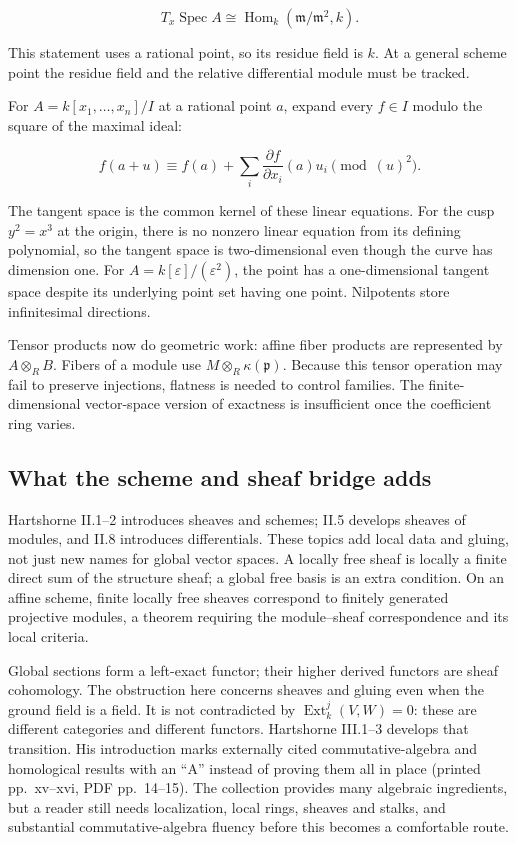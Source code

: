 \documentclass[
  11pt,
]{article}
\begin{document}
\[T_x\operatorname{Spec}A\cong
\operatorname{Hom}_k(\mathfrak m/\mathfrak m^2,k).\]

This statement uses a rational point, so its residue field is \(k\). At
a general scheme point the residue field and the relative differential
module must be tracked.

For \(A=k[x_1,\ldots,x_n]/I\) at a rational point \(a\), expand every
\(f\in I\) modulo the square of the maximal ideal:

\[f(a+u)\equiv f(a)+\sum_i
\frac{\partial f}{\partial x_i}(a)u_i\pmod{(u)^2}.\]

The tangent space is the common kernel of these linear equations. For
the cusp \(y^2=x^3\) at the origin, there is no nonzero linear equation
from its defining polynomial, so the tangent space is two-dimensional
even though the curve has dimension one. For
\(A=k[\varepsilon]/(\varepsilon^2)\), the point has a one-dimensional
tangent space despite its underlying point set having one point.
Nilpotents store infinitesimal directions.

Tensor products now do geometric work: affine fiber products are
represented by \(A\otimes_R B\). Fibers of a module use
\(M\otimes_R\kappa(\mathfrak p)\). Because this tensor operation may
fail to preserve injections, flatness is needed to control families. The
finite-dimensional vector-space version of exactness is insufficient
once the coefficient ring varies.

\subsection{What the scheme and sheaf bridge
adds}\label{what-the-scheme-and-sheaf-bridge-adds}

Hartshorne II.1--2 introduces sheaves and schemes; II.5 develops sheaves
of modules, and II.8 introduces differentials. These topics add local
data and gluing, not just new names for global vector spaces. A locally
free sheaf is locally a finite direct sum of the structure sheaf; a
global free basis is an extra condition. On an affine scheme, finite
locally free sheaves correspond to finitely generated projective
modules, a theorem requiring the module--sheaf correspondence and its
local criteria.

Global sections form a left-exact functor; their higher derived functors
are sheaf cohomology. The obstruction here concerns sheaves and gluing
even when the ground field is a field. It is not contradicted by
\(\operatorname{Ext}^j_k(V,W)=0\): these are different categories and
different functors. Hartshorne III.1--3 develops that transition. His
introduction marks externally cited commutative-algebra and homological
results with an ``A'' instead of proving them all in place (printed
pp.~xv--xvi, PDF pp.~14--15). The collection provides many algebraic
ingredients, but a reader still needs localization, local rings, sheaves
and stalks, and substantial commutative-algebra fluency before this
becomes a comfortable route.
\end{document}
